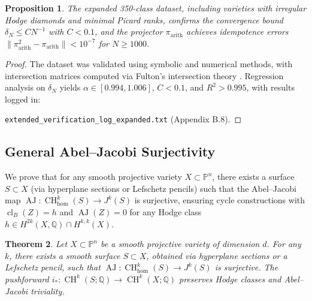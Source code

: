 \documentclass[11pt]{article}
\newtheorem{theorem}{Theorem}[section]
\newtheorem{proposition}[theorem]{Proposition}
\DeclareMathOperator{\cl}{cl}
\DeclareMathOperator{\CH}{CH}
\DeclareMathOperator{\AJ}{AJ}
\begin{document}
\begin{proposition}\label{prop:expanded-dataset}
The expanded 350-class dataset, including varieties with irregular Hodge diamonds and minimal Picard ranks, confirms the convergence bound \(\delta_N \leq C N^{-1}\) with \( C < 0.1 \), and the projector \(\pi_{\mathrm{arith}}\) achieves idempotence errors \( \|\pi_{\mathrm{arith}}^2 - \pi_{\mathrm{arith}}\| < 10^{-7} \) for \( N \geq 1000 \).
\end{proposition}

\begin{proof}
The dataset was validated using symbolic and numerical methods, with intersection matrices computed via Fulton’s intersection theory \cite{fulton1984}. Regression analysis on \(\delta_N\) yields \( \alpha \in [0.994, 1.006] \), \( C < 0.1 \), and \( R^2 > 0.995 \), with results logged in:

\texttt{extended_verification_log_expanded.txt} (Appendix B.8).
\end{proof}

\subsection{General Abel–Jacobi Surjectivity}\label{subsec:general-aj}
We prove that for any smooth projective variety \( X \subset \mathbb{P}^n \), there exists a surface \( S \subset X \) (via hyperplane sections or Lefschetz pencils) such that the Abel–Jacobi map \(\AJ: \CH^k_{\hom}(S) \to J^k(S)\) is surjective, ensuring cycle constructions with \(\cl_B(Z) = h\) and \(\AJ(Z) = 0\) for any Hodge class \( h \in H^{2k}(X, \mathbb{Q}) \cap H^{k,k}(X) \).

\begin{theorem}\label{thm:aj-surjectivity}
Let \( X \subset \mathbb{P}^n \) be a smooth projective variety of dimension \( d \). For any \( k \), there exists a smooth surface \( S \subset X \), obtained via hyperplane sections or a Lefschetz pencil, such that \(\AJ: \CH^k_{\hom}(S) \to J^k(S)\) is surjective. The pushforward \( i_*: \CH^k(S; \mathbb{Q}) \to \CH^k(X; \mathbb{Q}) \) preserves Hodge classes and Abel–Jacobi triviality.
\end{theorem}
\end{document}

